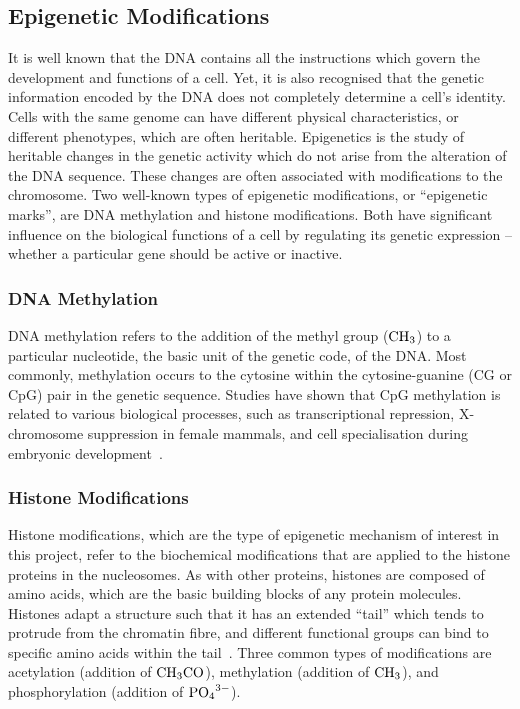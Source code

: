 \documentclass[12pt]{article}
\begin{document}
\subsection{Epigenetic Modifications}
It is well known that the DNA contains all the instructions which govern the development and functions of a cell. Yet, it is also recognised that the genetic information encoded by the DNA does not completely determine a cell's identity. Cells with the same genome can have different physical characteristics, or different phenotypes, which are often heritable. Epigenetics is the study of heritable changes in the genetic activity which do not arise from the alteration of the DNA sequence\cite{DNABook, probst2009}. These changes are often associated with modifications to the chromosome. Two well-known types of epigenetic modifications, or ``epigenetic marks'', are DNA methylation and histone modifications. Both have significant influence on the biological functions of a cell by regulating its genetic expression -- whether a particular gene should be active or inactive. 

\subsubsection{DNA Methylation}
DNA methylation refers to the addition of the methyl group ($\ce{CH3}$) to a particular nucleotide, the basic unit of the genetic code, of the DNA. Most commonly, methylation occurs to the cytosine within the cytosine-guanine (CG or CpG) pair in the genetic sequence. Studies have shown that CpG methylation is related to various biological processes, such as transcriptional repression, X-chromosome suppression in female mammals, and cell specialisation during embryonic development~\cite{DNABook}. 

\subsubsection{Histone Modifications}
\label{sec:histone}
Histone modifications, which are the type of epigenetic mechanism of interest in this project, refer to the biochemical modifications that are applied to the histone proteins in the nucleosomes. As with other proteins, histones are composed of amino acids, which are the basic building blocks of any protein molecules. Histones adapt a structure such that it has an extended ``tail'' which tends to protrude from the chromatin fibre, and different functional groups can bind to specific amino acids within the tail~\cite{strahl2000}. Three common types of modifications are acetylation (addition of $\ce{CH3CO}$), methylation (addition of $\ce{CH3}$), and phosphorylation (addition of $\ce{PO4^{3-}}$). 
\end{document}
